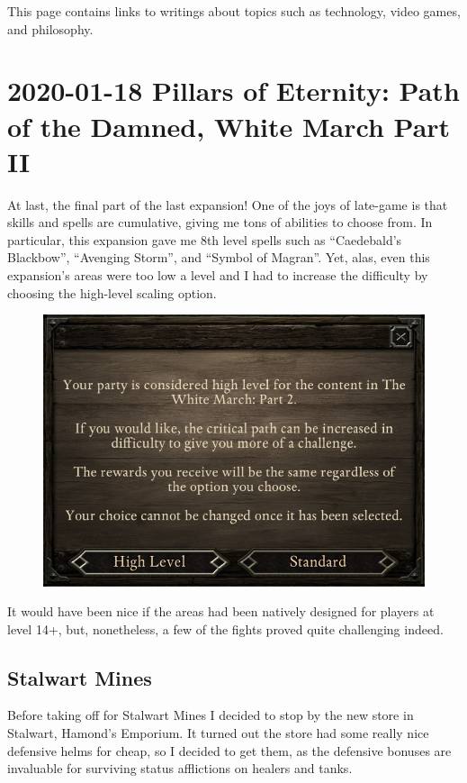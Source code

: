 \documentclass{article}
\begin{document}
This page contains links to writings about topics such as technology, video games, and philosophy.

\tableofchildlinks*

\section{2020-01-18 Pillars of Eternity: Path of the Damned, White March Part II}
At last, the final part of the last expansion!  One of the joys of late-game is that skills and spells are cumulative, giving me tons of abilities to choose from.  In particular, this expansion gave me 8th level spells such as ``Caedebald's Blackbow'', ``Avenging Storm'', and ``Symbol of Magran''.  Yet, alas, even this expansion's areas were too low a level and I had to increase the difficulty by choosing the high-level scaling option.

\begin{figure}
\includegraphics[scale=0.7]{files/blog/2020_01_18_poe_potd_wmpt2/2020_01_18_highlevel.jpg}
\end{figure}

It would have been nice if the areas had been natively designed for players at level 14+, but, nonetheless, a few of the fights proved quite challenging indeed.

\subsection{Stalwart Mines}
Before taking off for Stalwart Mines I decided to stop by the new store in Stalwart, Hamond's Emporium.  It turned out the store had some really nice defensive helms for cheap, so I decided to get them, as the defensive bonuses are invaluable for surviving status afflictions on healers and tanks.
\end{document}
